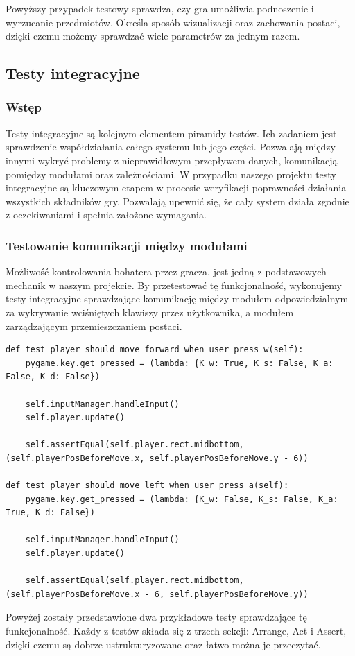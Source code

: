 \documentclass{article}
\begin{document}
Powyższy przypadek testowy sprawdza, czy gra umożliwia podnoszenie i wyrzucanie przedmiotów. Określa sposób wizualizacji oraz zachowania postaci, dzięki czemu możemy sprawdzać wiele parametrów za jednym razem.
\subsection{Testy integracyjne}
\subsubsection{Wstęp}
Testy integracyjne są kolejnym elementem piramidy testów. Ich zadaniem jest sprawdzenie współdziałania całego systemu lub jego części. Pozwalają między innymi wykryć problemy z nieprawidłowym przepływem danych, komunikacją pomiędzy modułami oraz zależnościami. W przypadku naszego projektu testy integracyjne są kluczowym etapem w procesie weryfikacji poprawności działania wszystkich składników gry. Pozwalają upewnić się, że cały system działa zgodnie z oczekiwaniami i spełnia założone wymagania.
\subsubsection{Testowanie komunikacji między modułami}
Możliwość kontrolowania bohatera przez gracza, jest jedną z podstawowych mechanik w naszym projekcie. By przetestować tę funkcjonalność, wykonujemy testy integracyjne sprawdzające komunikację między modułem odpowiedzialnym za wykrywanie wciśniętych klawiszy przez użytkownika, a modułem zarządzającym przemieszczaniem postaci.

\begin{lstlisting}[language=pythonSchema]
def test_player_should_move_forward_when_user_press_w(self):
    pygame.key.get_pressed = (lambda: {K_w: True, K_s: False, K_a: False, K_d: False})

    self.inputManager.handleInput()
    self.player.update()

    self.assertEqual(self.player.rect.midbottom, (self.playerPosBeforeMove.x, self.playerPosBeforeMove.y - 6))

def test_player_should_move_left_when_user_press_a(self):
    pygame.key.get_pressed = (lambda: {K_w: False, K_s: False, K_a: True, K_d: False})

    self.inputManager.handleInput()
    self.player.update()

    self.assertEqual(self.player.rect.midbottom, (self.playerPosBeforeMove.x - 6, self.playerPosBeforeMove.y))
\end{lstlisting}
Powyżej zostały przedstawione dwa przykładowe testy sprawdzające tę funkcjonalność. Każdy z testów składa się z trzech sekcji: Arrange, Act i Assert\cite{tech:ArrangeActAssert}, dzięki czemu są dobrze ustrukturyzowane oraz łatwo można je przeczytać.
\end{document}
